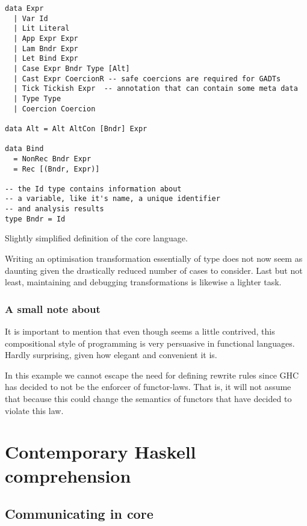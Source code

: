 \begin{listing}[H]
\begin{verbatim}
data Expr
  | Var Id
  | Lit Literal
  | App Expr Expr
  | Lam Bndr Expr
  | Let Bind Expr
  | Case Expr Bndr Type [Alt]
  | Cast Expr CoercionR -- safe coercions are required for GADTs
  | Tick Tickish Expr  -- annotation that can contain some meta data
  | Type Type
  | Coercion Coercion
  
data Alt = Alt AltCon [Bndr] Expr
 
data Bind
  = NonRec Bndr Expr
  = Rec [(Bndr, Expr)]
  
-- the Id type contains information about
-- a variable, like it's name, a unique identifier
-- and analysis results
type Bndr = Id
\end{verbatim}
\caption{Slightly simplified definition of the core language.}
\label{code:core_def}
\end{listing}

Writing an optimisation transformation essentially of type \hs{[Bind] -> [Bind]} does not now seem
as daunting given the drastically reduced number of cases to consider. 
Last but not least, maintaining and debugging transformations is likewise a lighter task.


\subsubsection{A small note about }

It is important to mention that even though  seems a little contrived,
this compositional style of programming is very persuasive in functional languages.
Hardly surprising, given how elegant and convenient it is.

In this example we cannot escape the need for defining rewrite rules since GHC has
decided to not be the enforcer of functor-laws. That is, it will not assume that
 because this could change the semantics of
functors that have decided to violate this law.

\section{Contemporary Haskell comprehension}

\subsection{Communicating in core}
\label{section:communicating_core}

